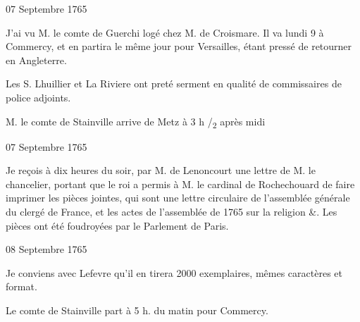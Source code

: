                      \begin{diary}{07 Septembre 1765}{}

                         J'ai vu M. le
                              comte de Guerchi logé chez
                           M. de Croismare. Il va lundi 9 à
                           Commercy, et en partira le
                           même jour pour
                           Versailles, étant pressé
                           de retourner en Angleterre. \bigskip


                         Les S.
                           Lhuillier et La Riviere ont preté
                           serment en qualité de commissaires de police
                           adjoints. \bigskip



                           M. le comte de Stainville arrive
                           de Metz à
                           3 h /\textsubscript{2}
                           après midi \bigskip


                     \end{diary}


                     \begin{diary}{07 Septembre 1765}{}

                         Je reçois à dix heures du soir, par
                              M. de
                              Lenoncourt une lettre de M. le chancelier,
                           portant que le roi a
                           permis à M. le cardinal
                              de Rochechouard
                           de faire imprimer les pièces jointes, qui sont une
                           lettre circulaire de l'assemblée générale du
                           clergé de France, et les actes de
                              l'assemblée
                              de 1765 sur la religion \&. Les pièces ont
                           été foudroyées par le Parlement de Paris. \bigskip


                     \end{diary}

                     \begin{diary}{08 Septembre 1765}{}

                         Je conviens avec Lefevre qu'il en tirera
                           2000 exemplaires, mêmes caractères et format. \bigskip



                           Le comte de Stainville part à 5 h.
                           du matin
                           pour Commercy. \bigskip


                     \end{diary}

